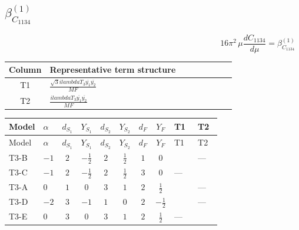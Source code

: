 \documentclass[8pt]{article}
\begin{document}
\begin{landscape}
\section*{$\beta_{C_{1134}}^{(1)}$}
\[16\pi^2\,\mu\frac{d C_{1134}}{d\mu}=\beta_{C_{1134}}^{(1)}\]
\begin{center}
\begin{tabular}{@{}c >{\raggedright\arraybackslash}p{0.82\linewidth}@{}}
\toprule
Column & Representative term structure \\
\midrule
T1 & \(\displaystyle \frac{\sqrt{3} i lambdaT_{3} \overline{y_{1}} \overline{y_{2}}}{MF}\) \\
\midrule
T2 & \(\displaystyle \frac{i lambdaT_{3} \overline{y_{1}} \overline{y_{2}}}{MF}\) \\
\midrule
\bottomrule
\end{tabular}
\end{center}
\smallskip
\tiny
\begin{longtable}{@{}llcccccc >{\raggedright\arraybackslash}p{0.21\linewidth} >{\raggedright\arraybackslash}p{0.21\linewidth}@{}}
\toprule
Model & $\alpha$ & $d_{S_1}$ & $Y_{S_1}$ & $d_{S_2}$ & $Y_{S_2}$ & $d_F$ & $Y_F$ & T1 & T2 \\
\midrule
\endfirsthead
\toprule
Model & $\alpha$ & $d_{S_1}$ & $Y_{S_1}$ & $d_{S_2}$ & $Y_{S_2}$ & $d_F$ & $Y_F$ & T1 & T2 \\
\midrule
\endhead
T3-B & $-1$ & $2$ & $-\frac{1}{2}$ & $2$ & $\frac{1}{2}$ & $1$ & $0$ & \scriptsize\adjustbox{max width=\linewidth}{$\begin{gathered} \frac{2 \sqrt{3} i lambdaT_{3} \overline{y_{1}} \overline{y_{2}}}{3 MF}\end{gathered}$} & --- \\
\midrule
T3-C & $-1$ & $2$ & $-\frac{1}{2}$ & $2$ & $\frac{1}{2}$ & $3$ & $0$ & --- & \scriptsize\adjustbox{max width=\linewidth}{$\begin{gathered} - \frac{4 i lambdaT_{3} \overline{y_{1}} \overline{y_{2}}}{3 MF}\end{gathered}$} \\
\midrule
T3-A & $0$ & $1$ & $0$ & $3$ & $1$ & $2$ & $\frac{1}{2}$ & \scriptsize\adjustbox{max width=\linewidth}{$\begin{gathered} \frac{2 \sqrt{3} i lambdaT_{3} \overline{y_{1}} \overline{y_{2}}}{3 MF}\end{gathered}$} & --- \\
\midrule
T3-D & $-2$ & $3$ & $-1$ & $1$ & $0$ & $2$ & $-\frac{1}{2}$ & \scriptsize\adjustbox{max width=\linewidth}{$\begin{gathered} \frac{2 \sqrt{3} i lambdaT_{3} \overline{y_{1}} \overline{y_{2}}}{3 MF}\end{gathered}$} & --- \\
\midrule
T3-E & $0$ & $3$ & $0$ & $3$ & $1$ & $2$ & $\frac{1}{2}$ & --- & \scriptsize\adjustbox{max width=\linewidth}{$\begin{gathered} - \frac{2 i lambdaT_{3} \overline{y_{1}} \overline{y_{2}}}{MF}\end{gathered}$} \\
\midrule
\bottomrule
\end{longtable}
\clearpage

\end{landscape}
\end{document}
